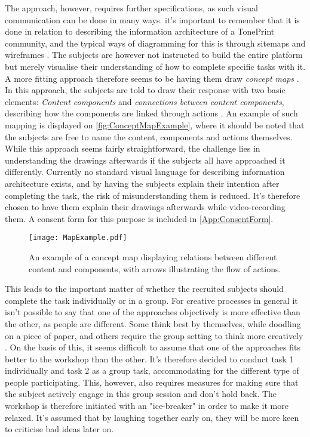 The approach, however, requires further specifications, as such visual communication can be done in many ways. it's important to remember that it is done in relation to describing the information architecture of a TonePrint community, and the typical ways of diagramming for this is through sitemaps and wireframes \parencite[][392]{PDF:InformationArchitecture}. The subjects are however not instructed to build the entire platform but merely visualise their understanding of how to complete specific tasks with it. A more fitting approach therefore seems to be having them draw \textit{concept maps} \parencite[][113]{WEB:ConceptMapAnalysis}. In this approach, the subjects are told to draw their response with two basic elements: \textit{Content components} and \textit{connections between content components}, describing how the components are linked through actions \parencite[][393]{PDF:InformationArchitecture}. An example of such mapping is displayed on \autoref{fig:ConceptMapExample}, where it should be noted that the subjects are free to name the content, components and actions themselves. While this approach seems fairly straightforward, the challenge lies in understanding the drawings afterwards if the subjects all have approached it differently. Currently no standard visual language for describing information architecture exists, and by having the subjects explain their intention after completing the task, the risk of misunderstanding them is reduced. It's therefore chosen to have them explain their drawings afterwards while video-recording them. A consent form for this purpose is included in \autoref{App:ConsentForm}.
%
\begin{figure}[H]
	\centering
	\texttt{[image: MapExample.pdf]}
	\caption{An example of a concept map displaying relations between different content and components, with arrows illustrating the flow of actions.}
	\label{fig:ConceptMapExample}
\end{figure}
%
\noindent
This leads to the important matter of whether the recruited subjects should complete the task individually or in a group. For creative processes in general it isn't possible to say that one of the approaches objectively is more effective than the other, as people are different. Some think best by themselves, while doodling on a piece of paper, and others require the group setting to think more creatively \parencite[][362]{PDF:InformationArchitecture}. On the basis of this, it seems difficult to assume that one of the approaches fits better to the workshop than the other. It's therefore decided to conduct task 1 individually and task 2 as a group task, accommodating for the different type of people participating. This, however, also requires measures for making sure that the subject actively engage in this group session and don't hold back. The workshop is therefore initiated with an "ice-breaker" in order to make it more relaxed. It's assumed that by laughing together early on, they will be more keen to criticise bad ideas later on.

